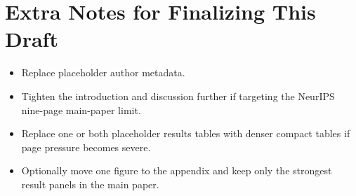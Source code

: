 \documentclass{article}
\begin{document}
\section{Extra Notes for Finalizing This Draft}
\begin{itemize}[leftmargin=1.5em]
\item Replace placeholder author metadata.
\item Tighten the introduction and discussion further if targeting the NeurIPS nine-page main-paper limit.
\item Replace one or both placeholder results tables with denser compact tables if page pressure becomes severe.
\item Optionally move one figure to the appendix and keep only the strongest result panels in the main paper.
\end{itemize}


\end{document}
